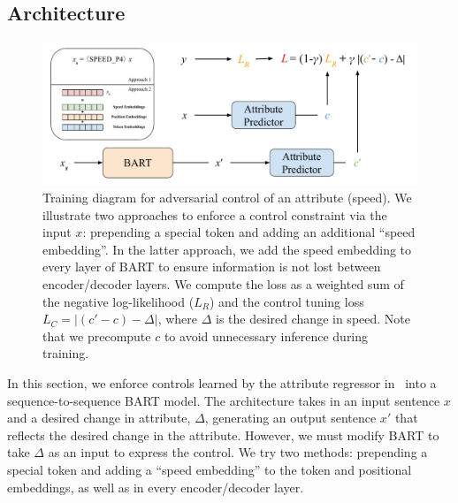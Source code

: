 \subsection{Architecture}
\label{subsec:ac_model}



\begin{figure}
    \centering
    \caption{Training diagram for adversarial control of an attribute (\eg speed). We illustrate two approaches to enforce a control constraint via the input $x$: prepending a special token and adding an additional ``speed embedding''. In the latter approach, we add the speed embedding to every layer of BART to ensure information is not lost between encoder/decoder layers. We compute the loss as a weighted sum of the negative log-likelihood ($L_R$) and the control tuning loss $L_C = |(c' - c) - \Delta|$, where $\Delta$ is the desired change in speed. Note that we precompute $c$ to avoid unnecessary inference during training.}
    \label{fig:ac_architecture}
    \includegraphics[width=\linewidth]{figs/AC-Architecture-H.pdf}
\end{figure}

In this section, we enforce controls learned by the attribute regressor in~ into a sequence-to-sequence BART model. The architecture takes in an input sentence $x$ and a desired change in attribute, $\Delta$, generating an output sentence $x'$ that reflects the desired change in the attribute. However, we must modify BART to take $\Delta$ as an input to express the control. We try two methods: prepending a special token and adding a ``speed embedding'' to the token and positional embeddings, as well as in every encoder/decoder layer.

